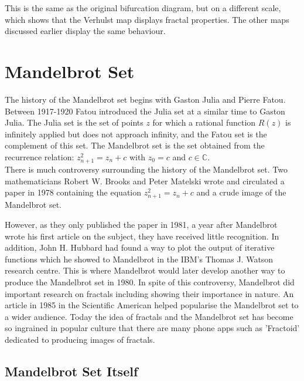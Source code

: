\documentclass[a4wide, 10pt]{article}
\begin{document}
This is the same as the original bifurcation diagram, but on a different scale, which shows that the Verhulst map displays fractal properties. The other maps discussed earlier display the same behaviour.



\section{Mandelbrot Set}

The history of the Mandelbrot set begins with Gaston Julia and Pierre Fatou. Between 1917-1920 Fatou introduced the Julia set at a similar time to Gaston Julia. The Julia set is the set of points $z$  for which a rational function $R(z)$ is infinitely applied but does not approach infinity, and the Fatou set is the complement of this set. The Mandelbrot set is the set obtained from the recurrence relation: $ z^2_{n+1} = z_{n} + c$ with $z_{0} = c$ and $c \in \mathbb{C}$. 
\\There is much controversy surrounding the history of the Mandelbrot set. Two mathematicians Robert W. Brooks and Peter Matelski wrote and circulated a paper in 1978 containing the equation $ z^2_{n+1} = z_{n} + c$ and a crude image of the Mandelbrot set. 

However, as they only published the paper in 1981, a year after Mandelbrot wrote his first article on
 the subject, they have received little recognition. In addition, John H. Hubbard had found a way to
  plot the output of iterative functions which he showed to Mandelbrot in the IBM's Thomas J. Watson
   research centre. This is where Mandelbrot would later develop another way to produce the Mandelbrot
    set in 1980. In spite of this controversy, Mandelbrot did important research on fractals including showing their importance in nature. An article in 1985 in the
      Scientific American helped popularise the Mandelbrot set to a wider audience. Today the idea of
       fractals and the Mandelbrot set has become so ingrained in popular culture that there are many
        phone apps such as 'Fractoid' dedicated to producing images of fractals. 
   
\subsection{Mandelbrot Set Itself}
\end{document}
